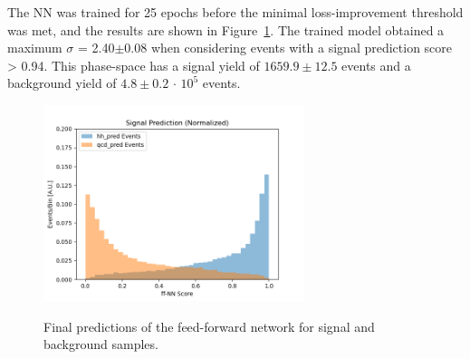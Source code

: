 The NN was trained for 25 epochs before the minimal loss-improvement threshold was met, and the results are shown in Figure~\ref{fig:results_nn}. The trained model obtained a maximum $\sigma$ = 2.40$\pm$0.08 when considering events with a signal prediction score > 0.94. This phase-space has a signal yield of $1659.9 \pm 12.5$ events and a background yield of $4.8 \pm 0.2$ $\cdot$ $10^5$ events. %

\begin{figure}[!h] 
\begin{center}
   \includegraphics[width = 3in]{ffNN/figures/score_ffnn_v3}\\
\caption{Final predictions of the feed-forward network for signal and background samples.}
  \label{fig:results_nn}
\end{center}
\end{figure}

